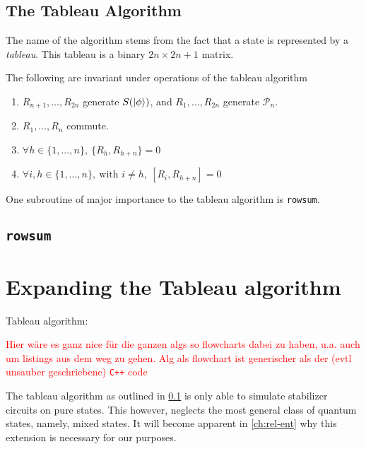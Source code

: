 \subsection{The Tableau Algorithm}\label{sec:tableau}
The name of the algorithm stems from the fact that a state is represented by a
\emph{tableau}. This tableau is a binary $2n\times2n+1$ matrix. 

\begin{prop}\label{prop:comm-tab}
  The following are invariant under operations of the tableau algorithm
  \begin{enumerate}
    \item $R_{n+1},\ldots,R_{2n}$ generate $S(\ket{\phi})$, and $R_1, \ldots,
      R_{2n}$ generate $\mathcal{P}_n$.
    \item $R_1, \ldots, R_n$ commute.
    \item $\forall h \in \{1,\ldots,n\}, \ \{R_h, R_{h+n}\} = 0$
    \item $\forall i,h \in \{1,\ldots,n\}, \ \text{with } i\neq h, \ [R_i, R_{h+n}] = 0$
  \end{enumerate}
  
\end{prop}

One subroutine of major importance to the tableau algorithm is \texttt{rowsum}.

\subsection{\texttt{rowsum}}\label{sec:rowsum}

\section{Expanding the Tableau algorithm}\label{sec:expanding}
Tableau algorithm: \cite{aaronsonImprovedSimulationStabilizer2004}

\textcolor{red}{Hier w\"are es ganz nice f\"ur die ganzen algs so flowcharts
dabei zu haben, u.a. auch um listings aus dem weg zu gehen. Alg als flowchart
ist generischer als der (evtl unsauber geschriebene) \texttt{C++} code}

The tableau algorithm as outlined in \cref{sec:tableau} is only able to
simulate stabilizer circuits on pure states. This however, neglects the most
general class of quantum states, namely, mixed states. It will become apparent
in \cref{ch:rel-ent} why this extension is necessary for our purposes. 
%
%  

